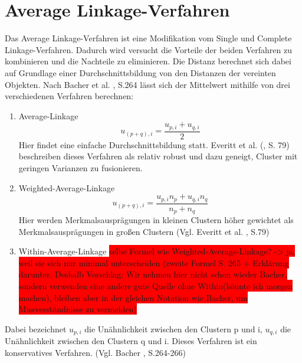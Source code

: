 \section{Average Linkage-Verfahren}
Das Average Linkage-Verfahren ist eine Modifikation vom Single und Complete Linkage-Verfahren. Dadurch wird versucht die Vorteile der beiden Verfahren zu kombinieren und die Nachteile zu eliminieren. Die Distanz berechnet sich dabei auf Grundlage einer Durchschnittsbildung von den Distanzen der vereinten Objekten.
Nach Bacher et al. \cite{Bacher.2010}, S.264 lässt sich der Mittelwert mithilfe von drei verschiedenen Verfahren berechnen:
\begin{enumerate}
	\item Average-Linkage
	\begin{equation}
		u_{(p+q),i} = \frac{u_{p,i} + u_{q,i}}{2}
	\end{equation}
	Hier findet eine einfache Durchschnittsbildung statt. Everitt et al. (\cite{Everitt.2011}, S. 79) beschreiben dieses Verfahren als relativ robust und dazu geneigt, Cluster mit geringen Varianzen zu fusionieren.
	\item Weighted-Average-Linkage
	\begin{equation}
		u_{(p+q),i} = \frac{u_{p,i}n_{p} + u_{q,i}n_{q}}{n_{p} + n_{q}}
	\end{equation}
	Hier werden Merkmalsausprägungen in kleinen Clustern höher gewichtet als Merkmalsausprägungen in großen Clustern (Vgl. Everitt et al. \cite{Everitt.2011}, S.79)
	\item Within-Average-Linkage \colorbox{red}{selbe Formel wie Weighted-Average-Linkage? -> ja, weil sie sich nur minimal unterscheiden (zweite Formel S. 265 + Erklärung darunter. Deshalb Vorschlag: Wir nehmen hier nicht schon wieder Bacher, sondern verwenden eine andere gute Quelle ohne Within(könnte ich morgen machen), bleiben aber in der gleichen Notation wie Bacher, um Missverständnisse zu vermeiden)}
\end{enumerate}
Dabei bezeichnet $u_{p,i}$ die Unähnlichkeit zwischen den Clustern p und i, $u_{q,i}$ die Unähnlichkeit zwischen den Clustern q und i.
Dieses Verfahren ist ein konservatives Verfahren. (Vgl. Bacher \cite{Bacher.2010}, S.264-266)  

